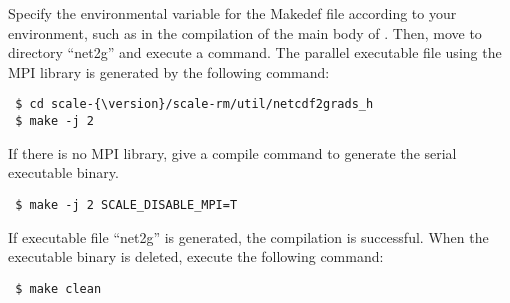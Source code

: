 Specify the environmental variable for the Makedef file according to your environment,
such as in the compilation of the main body of \scalelib. Then, move to directory  ``net2g'' and execute a command. The parallel executable file using the MPI library is generated by the following command:
\begin{verbatim}
 $ cd scale-{\version}/scale-rm/util/netcdf2grads_h
 $ make -j 2
\end{verbatim}
If there is no MPI library,
give a compile command to generate the serial executable binary.
\begin{verbatim}
 $ make -j 2 SCALE_DISABLE_MPI=T
\end{verbatim}
If executable file ``net2g'' is generated, the compilation is successful.
When the executable binary is deleted, execute the following command:
\begin{verbatim}
 $ make clean
\end{verbatim}



